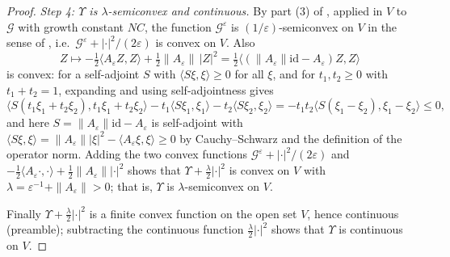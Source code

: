 \begin{proof}
\emph{Step 4: $\Upsilon$ is $\lambda$-semiconvex and continuous.}
By part (3) of , applied in $V$ to
$\mathcal G$ with growth constant $NC$, the function
$\mathcal G^\varepsilon$ is $(1/\varepsilon)$-semiconvex on $V$ in the sense of
, i.e.\ $\mathcal G^\varepsilon+|\cdot|^2/(2\varepsilon)$
is convex on $V$. Also
\[
  Z\mapsto-\tfrac12\langle A_\varepsilon Z,Z\rangle
    +\tfrac12\|A_\varepsilon\|\,|Z|^2
   =\tfrac12\bigl\langle(\|A_\varepsilon\|\mathrm{id}
     -A_\varepsilon)Z,Z\rangle
\]
is convex: for a self-adjoint $S$ with $\langle S\xi,\xi\rangle\ge0$ for all
$\xi$, and for $t_1,t_2\ge0$ with $t_1+t_2=1$, expanding and using
self-adjointness gives
\[
  \langle S(t_1\xi_1+t_2\xi_2),t_1\xi_1+t_2\xi_2\rangle
   -t_1\langle S\xi_1,\xi_1\rangle-t_2\langle S\xi_2,\xi_2\rangle
   =-t_1t_2\langle S(\xi_1-\xi_2),\xi_1-\xi_2\rangle\le0,
\]
and here $S=\|A_\varepsilon\|\mathrm{id}-A_\varepsilon$ is self-adjoint with
$\langle S\xi,\xi\rangle=\|A_\varepsilon\||\xi|^2
-\langle A_\varepsilon\xi,\xi\rangle\ge0$ by Cauchy--Schwarz and the definition
of the operator norm. Adding the two convex functions
$\mathcal G^\varepsilon+|\cdot|^2/(2\varepsilon)$ and
$-\tfrac12\langle A_\varepsilon\cdot,\cdot\rangle
+\tfrac12\|A_\varepsilon\||\cdot|^2$ shows that
$\Upsilon+\tfrac{\lambda}{2}|\cdot|^2$ is convex on $V$ with
$\lambda=\varepsilon^{-1}+\|A_\varepsilon\|>0$; that is, $\Upsilon$ is
$\lambda$-semiconvex on $V$.

Finally $\Upsilon+\tfrac\lambda2|\cdot|^2$ is a finite convex function on the
open set $V$, hence continuous (preamble); subtracting the continuous function
$\tfrac\lambda2|\cdot|^2$ shows that $\Upsilon$ is continuous on $V$.
\end{proof}
